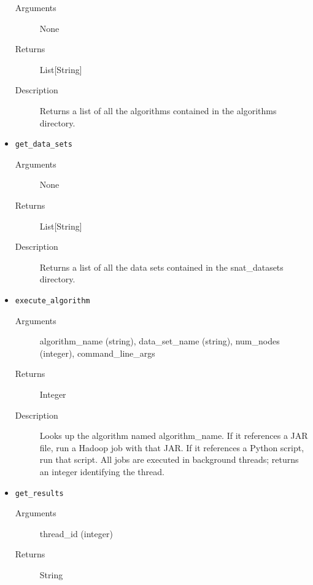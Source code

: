 \begin{itemize}
    \begin{description}        
        \item[Arguments] None
        
        \item[Returns] List[String]
        
        \item[Description] Returns a list of all the algorithms contained in the
algorithms directory.
    \end{description}
    
    \item {\tt get\_data\_sets}

    \begin{description}        
        \item[Arguments] None
        
        \item[Returns] List[String]
        
        \item[Description] Returns a list of all the data sets contained in the
snat\_datasets directory.
    \end{description}
    
    \item {\tt execute\_algorithm}

    \begin{description}        
        \item[Arguments] algorithm\_name (string), data\_set\_name (string),
num\_nodes (integer), command\_line\_args
        
        \item[Returns] Integer
        
        \item[Description] Looks up the algorithm named algorithm\_name. If it
references a JAR file, run a Hadoop job with that JAR. If it references a Python
script, run that script. All jobs are executed in background threads; returns an
integer identifying the thread.
    \end{description}
    
    \item {\tt get\_results}

    \begin{description}        
        \item[Arguments] thread\_id (integer)
        
        \item[Returns] String
        

\end{description}
\end{itemize}
